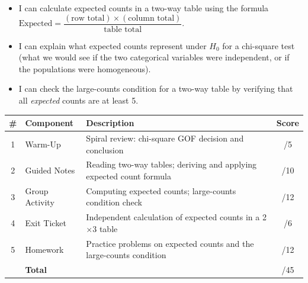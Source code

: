 \documentclass[10pt]{article}
\begin{document}

\vspace{2.4cm}
\namedateperiod

\begin{learningtargetbox}
\begin{itemize}
    \item I can calculate expected counts in a two-way table using the formula
          $\text{Expected} = \dfrac{(\text{row total}) \times (\text{column total})}{\text{table total}}$.
    \item I can explain what expected counts represent under $H_0$ for a chi-square test
          (what we would see if the two categorical variables were independent, or if the
          populations were homogeneous).
    \item I can check the large-counts condition for a two-way table by verifying that
          all \emph{expected} counts are at least 5.
\end{itemize}
\end{learningtargetbox}

\begin{tocbox}
\renewcommand{\arraystretch}{1.5}
\begin{tabularx}{\linewidth}{clXc}
    \textbf{\#} & \textbf{Component} & \textbf{Description} & \textbf{Score} \\
    \hline
    1 & Warm-Up        & Spiral review: chi-square GOF decision and conclusion       & \hfill/5 \\
    2 & Guided Notes   & Reading two-way tables; deriving and applying expected count formula & \hfill/10 \\
    3 & Group Activity & Computing expected counts; large-counts condition check     & \hfill/12 \\
    4 & Exit Ticket    & Independent calculation of expected counts in a 2$\times$3 table & \hfill/6 \\
    5 & Homework       & Practice problems on expected counts and the large-counts condition & \hfill/12 \\
    \hline
       & \multicolumn{2}{l}{\textbf{Total}} & \hfill/45 \\
\end{tabularx}
\end{tocbox}
\end{document}
